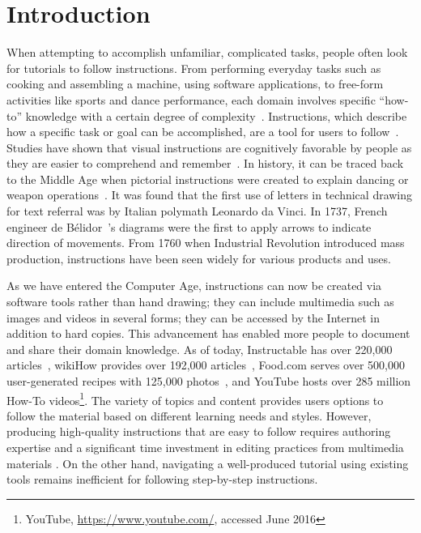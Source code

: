 \chapter{Introduction}
\label{chapter_introduction}

When attempting to accomplish unfamiliar, complicated tasks, people often look for tutorials to follow instructions. From performing everyday tasks such as cooking and assembling a machine, using software applications, to free-form activities like sports and dance performance, each domain involves specific ``how-to'' knowledge with a certain degree of complexity~\cite{ryle1945knowhow}.
%
Instructions, which describe how a specific task or goal can be accomplished, are a tool for users to follow~\cite{Smith03iimanufacturer}. Studies have shown that visual instructions are cognitively favorable by people as they are easier to comprehend and remember~\cite{Harrison:1995uh,Heiser:2004:IVC:989863.989917}. In history, it can be traced back to the Middle Age when pictorial instructions were created to explain dancing or weapon operations~\cite{mijksenaar1999open}. It was found that the first use of letters in technical drawing for text referral was by Italian polymath Leonardo da Vinci. In 1737, French engineer de B{\'e}lidor~\cite{de1737architecture}'s diagrams were the first to apply arrows to indicate direction of movements.
%
From 1760 when Industrial Revolution introduced mass production, instructions have been seen widely for various products and uses.

As we have entered the Computer Age, instructions can now be created via software tools rather than hand drawing; they can include multimedia such as images and videos in several forms; they can be accessed by the Internet in addition to hard copies. This advancement has enabled more people to document and share their domain knowledge\cite{Lafreniere:2012tl}. As of today, Instructable has over 220,000 articles~\cite{InstructablesProjects}, wikiHow provides over 192,000 articles~\cite{wikiHowStatistics}, Food.com serves over 500,000 user-generated recipes with 125,000 photos~\cite{FoodComAbout}, and YouTube hosts over 285 million How-To videos\footnote{YouTube, \url{https://www.youtube.com/}, accessed June 2016}.
%
The variety of topics and content provides users options to follow the material based on different learning needs and styles.
%
However, producing high-quality instructions that are easy to follow requires authoring expertise and a significant time investment in editing practices from multimedia materials \cite{Muller:2009tw}. On the other hand, navigating a well-produced tutorial using existing tools remains inefficient for following step-by-step instructions.

